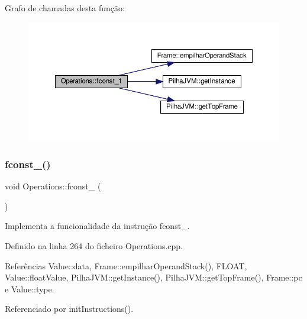 Grafo de chamadas desta função\+:
\nopagebreak
\begin{figure}[H]
\begin{center}
\leavevmode
\includegraphics[width=350pt]{classOperations_aa2053d7f3d410a4531f5bd560b4211b4_cgraph}
\end{center}
\end{figure}
\mbox{\label{classOperations_a1857c1a0e34d6f91dcb7166ca6d678a2}} 
\subsubsection{\texorpdfstring{fconst\+\_()}{fconst\_2()}}
{\footnotesize\ttfamily void Operations\+::fconst\+\_ (\begin{DoxyParamCaption}{ }\end{DoxyParamCaption})\hspace{0.3cm}{\ttfamily [private]}}



Implementa a funcionalidade da instrução fconst\+\_. 



Definido na linha 264 do ficheiro Operations.\+cpp.



Referências Value\+::data, Frame\+::empilhar\+Operand\+Stack(), F\+L\+O\+AT, Value\+::float\+Value, Pilha\+J\+V\+M\+::get\+Instance(), Pilha\+J\+V\+M\+::get\+Top\+Frame(), Frame\+::pc e Value\+::type.



Referenciado por init\+Instructions().

